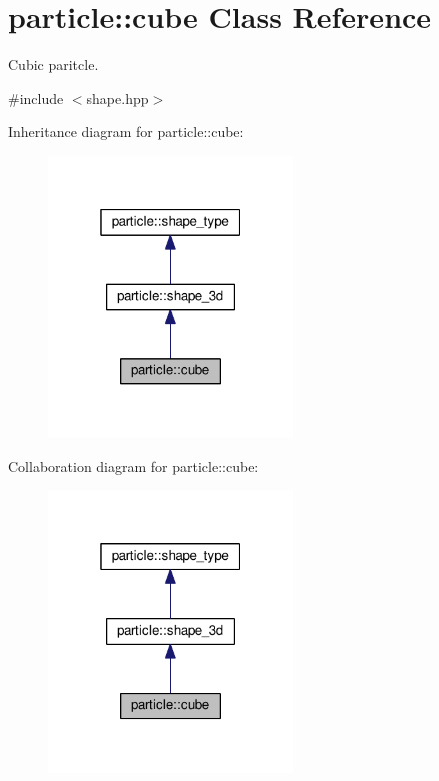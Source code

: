 \hypertarget{classparticle_1_1cube}{}\section{particle\+:\+:cube Class Reference}
\label{classparticle_1_1cube}


Cubic paritcle.  




{\ttfamily \#include $<$shape.\+hpp$>$}



Inheritance diagram for particle\+:\+:cube\+:
\nopagebreak
\begin{figure}[H]
\begin{center}
\leavevmode
\includegraphics[width=184pt]{d7/d87/classparticle_1_1cube__inherit__graph}
\end{center}
\end{figure}


Collaboration diagram for particle\+:\+:cube\+:
\nopagebreak
\begin{figure}[H]
\begin{center}
\leavevmode
\includegraphics[width=184pt]{d2/de4/classparticle_1_1cube__coll__graph}
\end{center}
\end{figure}
